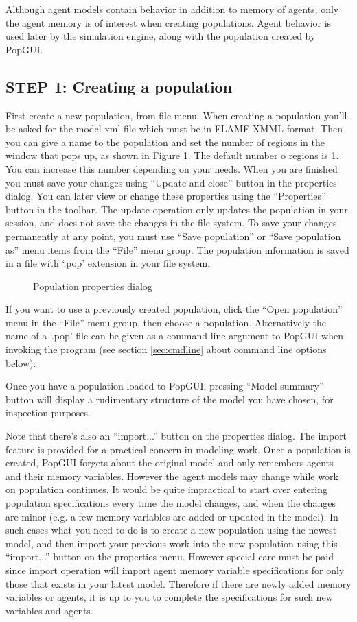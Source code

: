 \documentclass{article}
\begin{document}
Although agent models contain behavior in addition to memory of agents, only the agent memory is of interest when creating populations. Agent behavior is used later by the simulation engine, along with the population created by PopGUI.

\subsection{STEP 1: Creating a population}
First create a new population, from file menu. When creating a population you'll be asked for the model xml file which must be in FLAME XMML format. Then you can give a name to the population and set the number of regions in the window that pops up, as shown in Figure \ref{fig:properties}. The default number o regions is 1. You can increase this number depending on your needs. When you are finished you must save your changes using ``Update and close'' button in the properties dialog. You can later view or change these properties using the ``Properties'' button in the toolbar. The update operation only updates the population in your session, and does not save the changes in the file system. To save your changes permanently at any point, you must use ``Save population'' or ``Save population as'' menu items from the ``File'' menu group. The population information is saved in a file with `.pop' extension in your file system.
\begin{figure}
\caption{Population properties dialog}
\label{fig:properties}
\end{figure}
If you want to use a previously created population, click the ``Open population'' menu in the ``File'' menu group, then choose a population. Alternatively the name of a `.pop' file can be given as a command line argument to PopGUI when invoking the program (see section \ref{sec:cmdline} about command line options below).

Once you have a population loaded to PopGUI, pressing ``Model summary'' button will display a rudimentary structure of the model you have chosen, for inspection purposes. 

Note that there's also an ``import...'' button on the properties dialog. The import feature is provided for a practical concern in modeling work. Once a population is created, PopGUI forgets about the original model and only remembers agents and their memory variables. However the agent models may change while work on population continues. It would be quite impractical to start over entering population specifications every time the model changes, and when the changes are minor (e.g. a few memory variables are added or updated in the model). In such cases what you need to do is to create a new population using the newest model, and then import your previous work into the new population using this ``import...'' button on the properties menu. However special care must be paid since import operation will import agent memory variable specifications for only those that exists in your latest model. Therefore if there are newly added memory variables or agents, it is up to you to complete the specifications for such new variables and agents.
\end{document}
